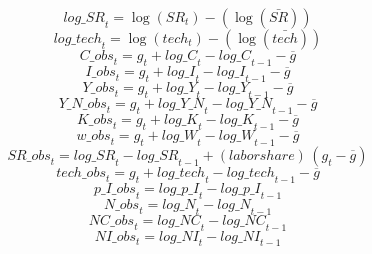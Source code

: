\begin{dmath}
{log\_SR}_{t}=\log\left({{SR}}_{t}\right)-(\log\left(\bar{{SR}}\right))
\end{dmath}
\begin{dmath}
{log\_tech}_{t}=\log\left({{tech}}_{t}\right)-(\log\left(\bar{{tech}}\right))
\end{dmath}
\begin{dmath}
{C\_obs}_{t}={{g}}_{t}+{log\_C}_{t}-{log\_C}_{t-1}-{{\overline{g}}}
\end{dmath}
\begin{dmath}
{I\_obs}_{t}={{g}}_{t}+{log\_I}_{t}-{log\_I}_{t-1}-{{\overline{g}}}
\end{dmath}
\begin{dmath}
{Y\_obs}_{t}={{g}}_{t}+{log\_Y}_{t}-{log\_Y}_{t-1}-{{\overline{g}}}
\end{dmath}
\begin{dmath}
{Y\_N\_obs}_{t}={{g}}_{t}+{log\_Y\_N}_{t}-{log\_Y\_N}_{t-1}-{{\overline{g}}}
\end{dmath}
\begin{dmath}
{K\_obs}_{t}={{g}}_{t}+{log\_K}_{t}-{log\_K}_{t-1}-{{\overline{g}}}
\end{dmath}
\begin{dmath}
{w\_obs}_{t}={{g}}_{t}+{log\_W}_{t}-{log\_W}_{t-1}-{{\overline{g}}}
\end{dmath}
\begin{dmath}
{SR\_obs}_{t}={log\_SR}_{t}-{log\_SR}_{t-1}+{(labor share)}\, \left({{g}}_{t}-{{\overline{g}}}\right)
\end{dmath}
\begin{dmath}
{tech\_obs}_{t}={{g}}_{t}+{log\_tech}_{t}-{log\_tech}_{t-1}-{{\overline{g}}}
\end{dmath}
\begin{dmath}
{p\_I\_obs}_{t}={log\_p\_I}_{t}-{log\_p\_I}_{t-1}
\end{dmath}
\begin{dmath}
{N\_obs}_{t}={log\_N}_{t}-{log\_N}_{t-1}
\end{dmath}
\begin{dmath}
{NC\_obs}_{t}={log\_NC}_{t}-{log\_NC}_{t-1}
\end{dmath}
\begin{dmath}
{NI\_obs}_{t}={log\_NI}_{t}-{log\_NI}_{t-1}
\end{dmath}
